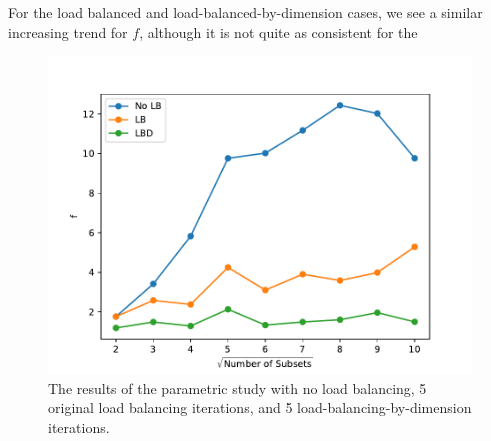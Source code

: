 For the load balanced and load-balanced-by-dimension cases, we see a similar increasing trend for $f$, although it is not quite as consistent for the
\begin{figure}[H]
\centering
\includegraphics[scale=0.7]{../figures/metric_study.pdf}
\caption{The results of the parametric study with no load balancing, 5 original load balancing iterations, and 5 load-balancing-by-dimension iterations.}
\label{metric_study}
\end{figure}
\begin{table}[H]
\centering
\caption{The tabulated results of the parametric study shown in Fig. \ref{metric_study} with no load balancing, 5 original load balancing iterations (LB), and 5 load-balancing-by-dimension (LBD) iterations.}
\label{metric_study_table}
\end{table}

